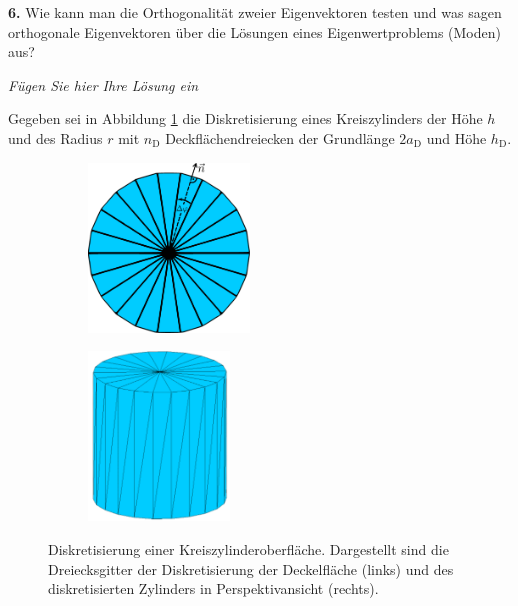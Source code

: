 \documentclass[Protokollheft.tex]{subfiles}
\begin{document}
    \begin{framed}
	\noindent \textbf{6.} Wie kann man die Orthogonalität zweier Eigenvektoren testen und was sagen orthogonale Eigenvektoren über die Lösungen eines Eigenwertproblems (Moden) aus?\label{exer:orthogonalEV}
\end{framed}

\emph{Fügen Sie hier Ihre Lösung ein}




    \noindent Gegeben sei in Abbildung \ref{fig:zylGitter} die Diskretisierung eines Kreiszylinders der Höhe $h$ und des Radius $r$ mit $n_\mathrm{D}$ Deckflächendreiecken der Grundlänge $2a_\text{D}$ und Höhe $h_\text{D}$.\\
	\begin{figure}[h]
		\centering
		\begin{subfigure}{0.49\textwidth}
			\centering
			\includegraphics[height=4.5cm]{v1_zylinder1.pdf}
		\end{subfigure}
		\begin{subfigure}{0.49\textwidth}
			\centering
			\includegraphics[height=4.5cm]{v1_zylinder2.pdf}
		\end{subfigure}
		\caption{Diskretisierung einer Kreiszylinderoberfläche. Dargestellt sind die Dreiecksgitter der Diskretisierung der Deckelfläche (links) und des diskretisierten Zylinders in Perspektivansicht (rechts).}\label{fig:zylGitter}
	\end{figure}
\end{document}
